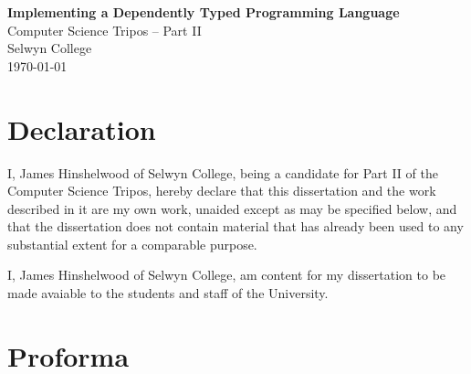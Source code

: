 \documentclass[12pt,a4paper,twoside]{report}
\begin{document}
\pagestyle{empty}


\vspace*{60mm}
\begin{center}
    \Huge
    \textbf{Implementing a Dependently Typed Programming Language} \\[5mm]
    Computer Science Tripos -- Part II \\[5mm]
    Selwyn College \\[5mm]
    \today
\end{center}


\pagestyle{plain}
\chapter*{Declaration}

I, James Hinshelwood of Selwyn College, being a candidate for Part II of the Computer Science Tripos, hereby declare that this dissertation and the work described in it are my own work, unaided except as may be specified below, and that the dissertation does not contain material that has already been used to any substantial extent for a comparable purpose.

I, James Hinshelwood of Selwyn College, am content for my dissertation to be made avaiable to the students and staff of the University.

\bigskip
{}

\medskip
{}

\chapter*{Proforma}
\end{document}
